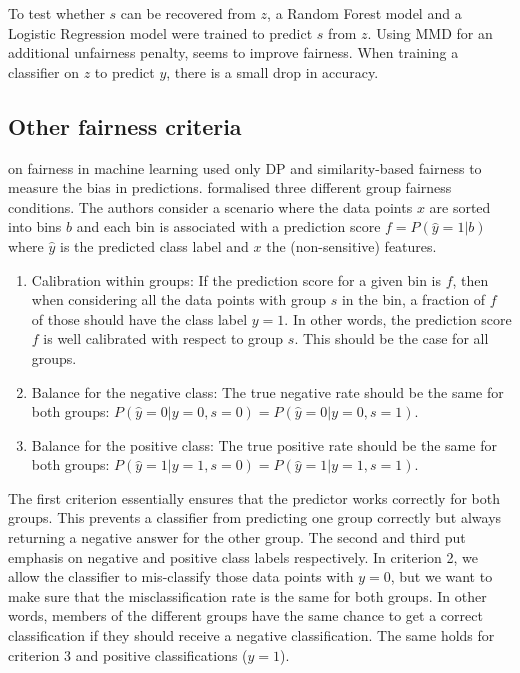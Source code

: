 To test whether \(s\) can be recovered from \(z\), a Random Forest model and a Logistic Regression
model were trained to predict \(s\) from \(z\).
Using \ac{MMD} for an additional unfairness penalty, seems to improve fairness. When training a
classifier on \(z\) to predict \(y\), there is a small drop in accuracy.

\subsection{Other fairness criteria}%
on fairness in machine learning used only \ac{DP} and si\-mi\-la\-ri\-ty-based fairness to measure
the bias in predictions. \citet{kleinberg2016inherent} formalised three different group fairness
conditions. The authors consider a scenario where the data points \(x\) are sorted into bins \(b\)
and each bin is associated with a prediction score \(f = P(\hat{y}=1|b)\) where \(\hat{y}\) is the
predicted class label and \(x\) the (non-sensitive) features. \begin{enumerate} \item Calibration
  within groups: If the prediction score for a given bin is \(f\), then when considering all the
  data points with group \(s\) in the bin, a fraction of \(f\) of those should have the class label
  \(y=1\). In other words, the prediction score \(f\) is well calibrated with respect to group
  \(s\). This should be the case for all groups. \item Balance for the negative class: The true
  negative rate should be the same for both groups: \(P(\hat{y}=0|y=0,s=0) =
  P(\hat{y}=0|y=0,s=1)\). \item Balance for the positive class: The true positive rate should be
  the same for both groups: \(P(\hat{y}=1|y=1,s=0) = P(\hat{y}=1|y=1,s=1)\). \end{enumerate}
The first criterion essentially ensures that the predictor works correctly for both groups. This
prevents a classifier from predicting one group correctly but always returning a negative answer
for the other group. The second and third put emphasis on negative and positive class labels
respectively. In criterion 2, we allow the classifier to mis-classify those data points with
\(y=0\), but we want to make sure that the misclassification rate is the same for both groups. In
other words, members of the different groups have the same chance to get a correct classification
if they should receive a negative classification. The same holds for criterion 3 and positive
classifications (\(y=1\)).

